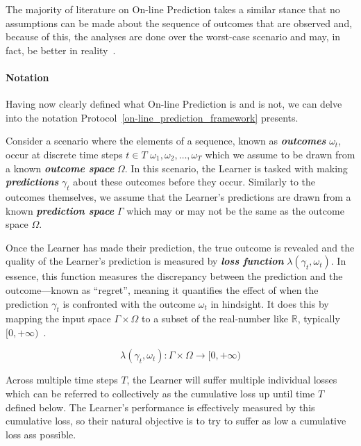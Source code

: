 The majority of literature on On-line Prediction takes a similar stance that no assumptions can be made about the sequence of outcomes that are observed and, because of this, the analyses are done over the worst-case scenario and may, in fact, be better in reality~\cite{cesa-bianchi:1997}.

\paragraph{Notation}\label{paragraph:notation}
Having now clearly defined what On-line Prediction is and is not, we can delve into the notation Protocol~\ref{on-line_prediction_framework} presents.

Consider a scenario where the elements of a sequence, known as \textbf{\textit{outcomes}} $\omega_t$, occur at discrete time steps $t \in T$ $\omega_1, \omega_2, \ldots, \omega_T$ which we assume to be drawn from a known \textbf{\textit{outcome space}} $\Omega$. In this scenario, the Learner is tasked with making \textbf{\textit{predictions}} $\gamma_t$ about these outcomes before they occur. Similarly to the outcomes themselves, we assume that the Learner's predictions are drawn from a known \textbf{\textit{prediction space}} $\Gamma$ which may or may not be the same as the outcome space $\Omega$.

Once the Learner has made their prediction, the true outcome is revealed and the quality of the Learner's prediction is measured by \textbf{\textit{loss function}} $\lambda(\gamma_t, \omega_t)$. In essence, this function measures the discrepancy between the prediction and the outcome—known as ``regret'', meaning it quantifies the effect of when the prediction $\gamma_t$ is confronted with the outcome $\omega_t$ in hindsight. It does this by mapping the input space $\Gamma \times \Omega$ to a subset of the real-number like $\mathbb{R}$, typically $[0, +\infty)$~\cite{kalnishkan:2009}.

\begin{equation}
    \lambda(\gamma_t, \omega_t): \Gamma \times \Omega \rightarrow [0, +\infty)
\end{equation}

Across multiple time steps $T$, the Learner will suffer multiple individual losses which can be referred to collectively as the cumulative loss up until time $T$ defined below. The Learner's performance is effectively measured by this cumulative loss, so their natural objective is to try to suffer as low a cumulative loss ass possible.

